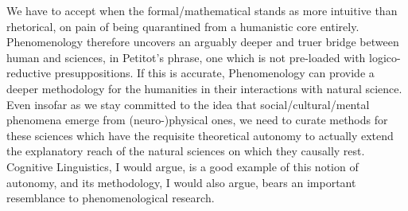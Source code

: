 {{We have to accept when the formal/mathematical stands as more intuitive 
than rhetorical, on pain of  being quarantined 
from a humanistic core entirely.
}  
Phenomenology therefore uncovers 
an arguably deeper and truer bridge between human and  sciences, 
in Petitot's phrase, one which is not pre-loaded with logico-reductive presuppositions.  
If this is accurate, Phenomenology can provide a deeper methodology 
for the humanities in their interactions with natural science.  
Even insofar as we stay committed to the idea 
that social/cultural/mental phenomena emerge from (neuro-)physical ones, we 
need to curate methods for these  sciences which have the requisite 
theoretical autonomy to actually extend the explanatory reach of the natural 
sciences on which they causally rest.  Cognitive Linguistics, I would argue, 
is a good example of this notion of autonomy, and its methodology, I would 
also argue, bears an important resemblance to phenomenological research. 
}

